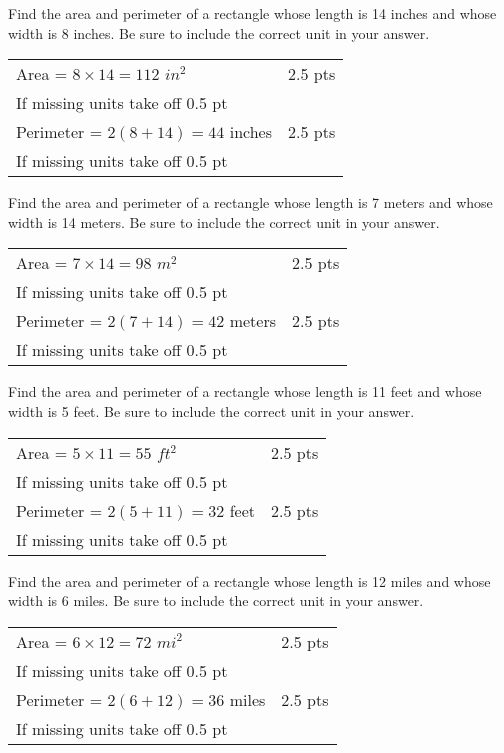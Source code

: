 {
	Find the area and perimeter of a rectangle whose length is 14 inches and whose width is 8 inches. Be sure to include the correct unit in your answer.
}
{
	\begin{tabular}{l r}
	Area = $8 \times 14 = 112$ $in^{2}$ & 2.5 pts \\  
	If missing units take off 0.5 pt\\
	Perimeter = $2(8 + 14)=44$ inches  & 2.5 pts \\ 
	If missing units take off 0.5 pt\\
	\end{tabular}
}

{
	Find the area and perimeter of a rectangle whose length is 7 meters and whose width is 14 meters. Be sure to include the correct unit in your answer.
}
{
	\begin{tabular}{l r}
	Area = $7 \times 14 = 98$ $m^{2}$ & 2.5 pts\\ 
	If missing units take off 0.5 pt\\
	Perimeter = $2(7+14)=42$ meters  & 2.5 pts\\
	If missing units take off 0.5 pt\\
	\end{tabular}
}

{
	Find the area and perimeter of a rectangle whose length is 11 feet and whose width is 5 feet. Be sure to include the correct unit in your answer.
}
{
	\begin{tabular}{l r}
	Area = $5 \times 11 = 55$ $ft^{2}$ & 2.5 pts \\
	If missing units take off 0.5 pt\\
	Perimeter = $2(5+11)=32$ feet  & 2.5 pts\\
	If missing units take off 0.5 pt\\
	\end{tabular}
}

{
	Find the area and perimeter of a rectangle whose length is 12 miles and whose width is 6 miles. Be sure to include the correct unit in your answer.
}
{
	\begin{tabular}{l r}
	Area = $6 \times 12 = 72$ $mi^{2}$ & 2.5 pts \\
	If missing units take off 0.5 pt\\
	Perimeter = $2(6+12)=36$ miles  & 2.5 pts \\
	If missing units take off 0.5 pt\\
	\end{tabular}
}
